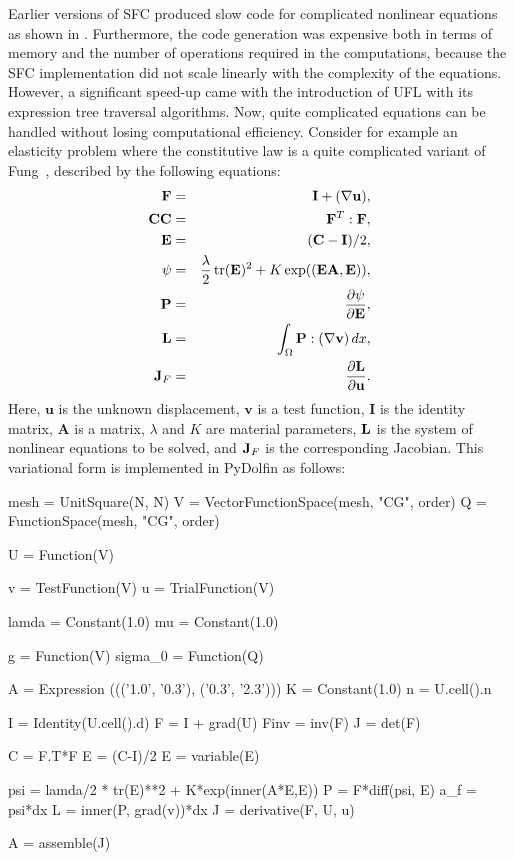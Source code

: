 Earlier versions of SFC produced slow code for complicated nonlinear
equations as shown in \citep{AlnaesMardal2009b}. Furthermore, 
the code generation was expensive both in terms of memory and the number
of operations required in the computations, because the SFC implementation
did not scale linearly with the complexity of the equations. 
However, a significant speed-up came with the introduction of UFL 
with its expression tree traversal algorithms.  
Now, quite complicated 
equations can be handled without losing computational efficiency. Consider for example an elasticity problem 
where the constitutive law is a quite complicated variant of
Fung~\citep{Fung1993}, described by 
the following equations: 
\begin{eqnarray}
\mathbf{F} &=& \mathbf{I} + (\nabla \mathbf{u}), \\  
\mathbf{CC} &=& \mathbf{F}^T: \mathbf{F}, \\
\mathbf{E} &=& (\mathbf{C}-\mathbf{I})/2, \\ 
\psi &=& \frac{\lambda}{2} \, \mbox{tr}(\mathbf{E})^2 + K\exp((\mathbf{E}\mathbf{A},\mathbf{E})), \\  
\mathbf{P} &=& \frac{\partial \psi}{\partial \mathbf{E}}, \\
\mathbf{L} &=& \int_\Omega \mathbf{P}: (\nabla \mathbf{v}) \, dx, \\  
\mathbf{J}_F &=& \frac{\partial \mathbf{L}}{\partial \mathbf{u}} . 
\end{eqnarray}
Here, $\mathbf{u}$ is the unknown displacement, $\mathbf{v}$ is a test function, $\mathbf{I}$ is the identity matrix, $\mathbf{A}$ 
is a matrix, $\lambda$ and $K$  are  material parameters, $\mathbf{L}$ is the system of nonlinear equations to be solved, and 
$\mathbf{J}_F$ is the corresponding Jacobian. 
This variational form is implemented in PyDolfin as follows: 
\begin{python}
  mesh = UnitSquare(N, N)
  V = VectorFunctionSpace(mesh, "CG", order)
  Q = FunctionSpace(mesh, "CG", order)
  
  U = Function(V)
  
  v = TestFunction(V)
  u = TrialFunction(V)
  
  lamda = Constant(1.0)
  mu = Constant(1.0)
  
  g       = Function(V)
  sigma_0 = Function(Q)
  
  A = Expression ((('1.0', '0.3'), ('0.3', '2.3')))
  K = Constant(1.0)
  n = U.cell().n
  
  I = Identity(U.cell().d)
  F = I + grad(U)
  Finv = inv(F)
  J = det(F)
  
  C = F.T*F
  E = (C-I)/2
  E = variable(E)
  
  psi = lamda/2 * tr(E)**2  +  K*exp(inner(A*E,E))
  P = F*diff(psi, E)
  a_f = psi*dx
  L = inner(P, grad(v))*dx 
  J = derivative(F, U, u)
  
  A = assemble(J)
\end{python}

